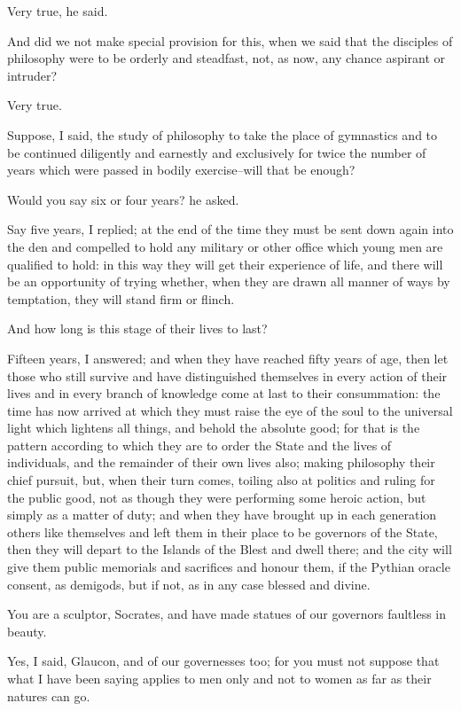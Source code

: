 Very true, he said.

And did we not make special provision for this, when we said that the
disciples of philosophy were to be orderly and steadfast, not, as now,
any chance aspirant or intruder?

Very true.

Suppose, I said, the study of philosophy to take the place of gymnastics
and to be continued diligently and earnestly and exclusively for twice
the number of years which were passed in bodily exercise--will that be
enough?

Would you say six or four years? he asked.

Say five years, I replied; at the end of the time they must be sent down
again into the den and compelled to hold any military or other office
which young men are qualified to hold: in this way they will get their
experience of life, and there will be an opportunity of trying whether,
when they are drawn all manner of ways by temptation, they will stand
firm or flinch.

And how long is this stage of their lives to last?

Fifteen years, I answered; and when they have reached fifty years of
age, then let those who still survive and have distinguished themselves
in every action of their lives and in every branch of knowledge come at
last to their consummation: the time has now arrived at which they must
raise the eye of the soul to the universal light which lightens all
things, and behold the absolute good; for that is the pattern according
to which they are to order the State and the lives of individuals, and
the remainder of their own lives also; making philosophy their chief
pursuit, but, when their turn comes, toiling also at politics and ruling
for the public good, not as though they were performing some heroic
action, but simply as a matter of duty; and when they have brought up in
each generation others like themselves and left them in their place to
be governors of the State, then they will depart to the Islands of the
Blest and dwell there; and the city will give them public memorials and
sacrifices and honour them, if the Pythian oracle consent, as demigods,
but if not, as in any case blessed and divine.

You are a sculptor, Socrates, and have made statues of our governors
faultless in beauty.

Yes, I said, Glaucon, and of our governesses too; for you must not
suppose that what I have been saying applies to men only and not to
women as far as their natures can go.

